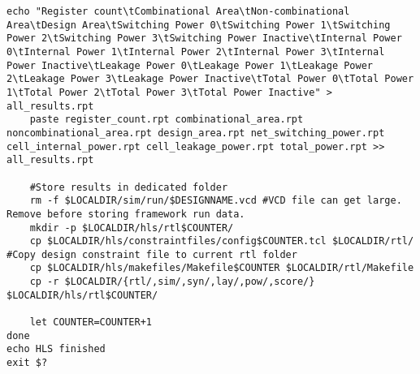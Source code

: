 \begin{lstlisting}[caption={HLS Script source code},label=lst:hlsscriptsourcecode]
	echo "Register count\tCombinational Area\tNon-combinational Area\tDesign Area\tSwitching Power 0\tSwitching Power 1\tSwitching Power 2\tSwitching Power 3\tSwitching Power Inactive\tInternal Power 0\tInternal Power 1\tInternal Power 2\tInternal Power 3\tInternal Power Inactive\tLeakage Power 0\tLeakage Power 1\tLeakage Power 2\tLeakage Power 3\tLeakage Power Inactive\tTotal Power 0\tTotal Power 1\tTotal Power 2\tTotal Power 3\tTotal Power Inactive" > all_results.rpt
	paste register_count.rpt combinational_area.rpt noncombinational_area.rpt design_area.rpt net_switching_power.rpt cell_internal_power.rpt cell_leakage_power.rpt total_power.rpt >> all_results.rpt
	
	#Store results in dedicated folder
	rm -f $LOCALDIR/sim/run/$DESIGNNAME.vcd #VCD file can get large. Remove before storing framework run data.
	mkdir -p $LOCALDIR/hls/rtl$COUNTER/
	cp $LOCALDIR/hls/constraintfiles/config$COUNTER.tcl $LOCALDIR/rtl/ #Copy design constraint file to current rtl folder
	cp $LOCALDIR/hls/makefiles/Makefile$COUNTER $LOCALDIR/rtl/Makefile
	cp -r $LOCALDIR/{rtl/,sim/,syn/,lay/,pow/,score/} $LOCALDIR/hls/rtl$COUNTER/
	
	let COUNTER=COUNTER+1 
done
echo HLS finished
exit $?
\end{lstlisting}
\clearpage

